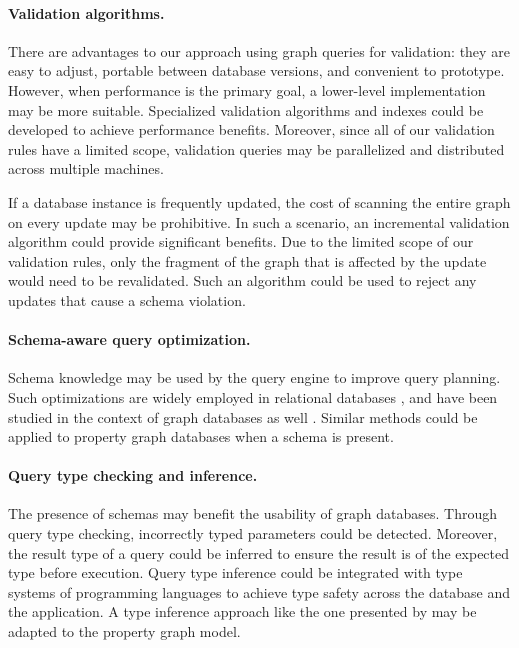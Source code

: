 \documentclass{report}
\theoremstyle{definition}
\begin{document}
\paragraph{Validation algorithms.} There are advantages to our approach using graph queries for validation: they are easy to adjust, portable between database versions, and convenient to prototype. However, when performance is the primary goal, a lower-level implementation may be more suitable. Specialized validation algorithms and indexes could be developed to achieve performance benefits. Moreover, since all of our validation rules have a limited scope, validation queries may be parallelized and distributed across multiple machines.

If a database instance is frequently updated, the cost of scanning the entire graph on every update may be prohibitive. In such a scenario, an incremental validation algorithm could provide significant benefits. Due to the limited scope of our validation rules, only the fragment of the graph that is affected by the update would need to be revalidated. Such an algorithm could be used to reject any updates that cause a schema violation.

\paragraph{Schema-aware query optimization.} Schema knowledge may be used by the query engine to improve query planning. Such optimizations are widely employed in relational databases \citep{chakravarthy1990logic, meier2013semantic,silberschatz2011database}, and have been studied in the context of graph databases as well \citep{buneman1997adding,popa1999equational}. Similar methods could be applied to property graph databases when a schema is present.

\paragraph{Query type checking and inference.} The presence of schemas may benefit the usability of graph databases. Through query type checking, incorrectly typed parameters could be detected. Moreover, the result type of a query could be inferred to ensure the result is of the expected type before execution. Query type inference could be integrated with type systems of programming languages to achieve type safety across the database and the application. A type inference approach like the one presented by \citet{colazzo2015typing} may be adapted to the property graph model.
\end{document}
